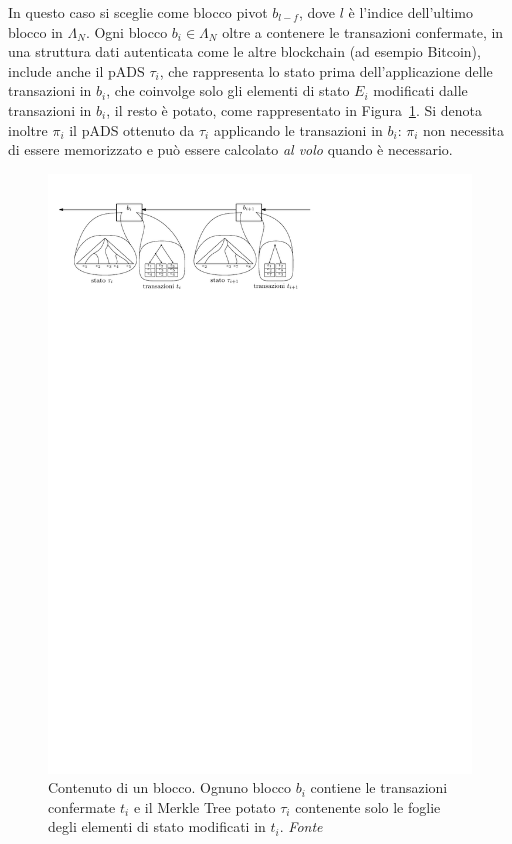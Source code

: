 In questo caso si sceglie come blocco pivot $b_{l-f}$, dove $l$ è l'indice dell'ultimo blocco in $\Lambda_N$. Ogni blocco $b_i \in \Lambda_N$ oltre a contenere le transazioni confermate, in una struttura dati autenticata come le altre blockchain (ad esempio Bitcoin), include anche il pADS $\tau_i$, che rappresenta lo stato prima dell'applicazione delle transazioni in $b_i$, che coinvolge solo gli elementi di stato $E_i$ modificati dalle transazioni in $b_i$, il resto è potato, come rappresentato in Figura~\ref{fig:block_content}. Si denota inoltre $\pi_i$ il pADS ottenuto da $\tau_i$ applicando le transazioni in $b_i$: $\pi_i$ non necessita di essere memorizzato e può essere calcolato \emph{al volo} quando è necessario.

\begin{figure}
	\centering
	\includegraphics{img/capdue/block_bern.pdf}
	\caption{Contenuto di un blocco. Ognuno blocco $b_i$ contiene le transazioni confermate $t_i$ e il Merkle Tree potato $\tau_i$ contenente solo le foglie degli elementi di stato modificati in $t_i$. \emph{Fonte~\cite{bernardini2019blockchains}}}
	\label{fig:block_content}
\end{figure}

